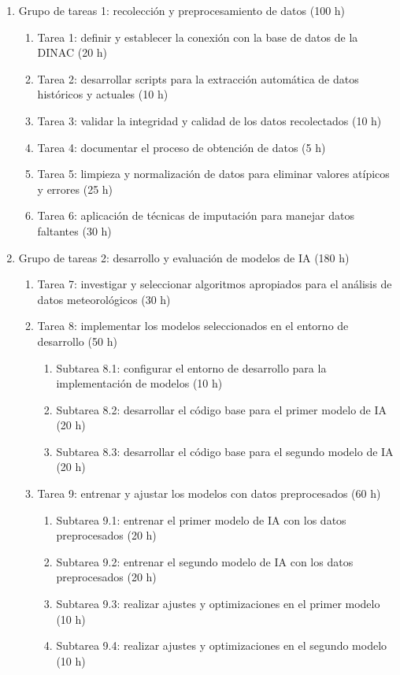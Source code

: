\documentclass[
11pt, %
codirector, %
]{charter}
\begin{document}
\begin{enumerate}
\item Grupo de tareas 1: recolección y preprocesamiento de datos (100 h)
	\begin{enumerate}
	\item Tarea 1: definir y establecer la conexión con la base de datos de la DINAC (20 h)
	\item Tarea 2: desarrollar scripts para la extracción automática de datos históricos y actuales (10 h)
	\item Tarea 3: validar la integridad y calidad de los datos recolectados (10 h)
	\item Tarea 4: documentar el proceso de obtención de datos (5 h)
	\item Tarea 5: limpieza y normalización de datos para eliminar valores atípicos y errores (25 h)
	\item Tarea 6: aplicación de técnicas de imputación para manejar datos faltantes (30 h)
	\end{enumerate}
\item Grupo de tareas 2: desarrollo y evaluación de modelos de IA (180 h)
	\begin{enumerate}
	\item Tarea 7: investigar y seleccionar algoritmos apropiados para el análisis de datos meteorológicos (30 h)
	\item Tarea 8: implementar los modelos seleccionados en el entorno de desarrollo (50 h)
	\begin{enumerate}
	\item Subtarea 8.1: configurar el entorno de desarrollo para la implementación de modelos (10 h)	
	\item Subtarea 8.2: desarrollar el código base para el primer modelo de IA (20 h)
	\item Subtarea 8.3: desarrollar el código base para el segundo modelo de IA (20 h)
	\end{enumerate}		
	\item Tarea 9: entrenar y ajustar los modelos con datos preprocesados (60 h)
	\begin{enumerate}
	\item Subtarea 9.1: entrenar el primer modelo de IA con los datos preprocesados (20 h)
	\item Subtarea 9.2: entrenar el segundo modelo de IA con los datos preprocesados (20 h)
	\item Subtarea 9.3: realizar ajustes y optimizaciones en el primer modelo (10 h)
	\item Subtarea 9.4: realizar ajustes y optimizaciones en el segundo modelo (10 h)

\end{enumerate}
\end{enumerate}
\end{enumerate}
\end{document}
